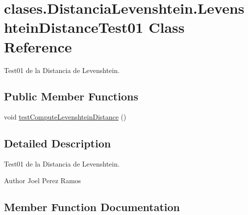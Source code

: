 \hypertarget{classclases_1_1_distancia_levenshtein_1_1_levenshtein_distance_test01}{}\section{clases.\+Distancia\+Levenshtein.\+Levenshtein\+Distance\+Test01 Class Reference}
\label{classclases_1_1_distancia_levenshtein_1_1_levenshtein_distance_test01}


Test01 de la Distancia de Levenshtein.  


\subsection*{Public Member Functions}
\begin{DoxyCompactItemize}
\item 
void \hyperlink{classclases_1_1_distancia_levenshtein_1_1_levenshtein_distance_test01_aae192451049290eabe6d0ac2e00f254b}{test\+Compute\+Levenshtein\+Distance} ()
\end{DoxyCompactItemize}


\subsection{Detailed Description}
Test01 de la Distancia de Levenshtein. 

\begin{DoxyAuthor}{Author}
Joel Perez Ramos 
\end{DoxyAuthor}


\subsection{Member Function Documentation}
\hypertarget{classclases_1_1_distancia_levenshtein_1_1_levenshtein_distance_test01_aae192451049290eabe6d0ac2e00f254b}{}\label{classclases_1_1_distancia_levenshtein_1_1_levenshtein_distance_test01_aae192451049290eabe6d0ac2e00f254b} 
